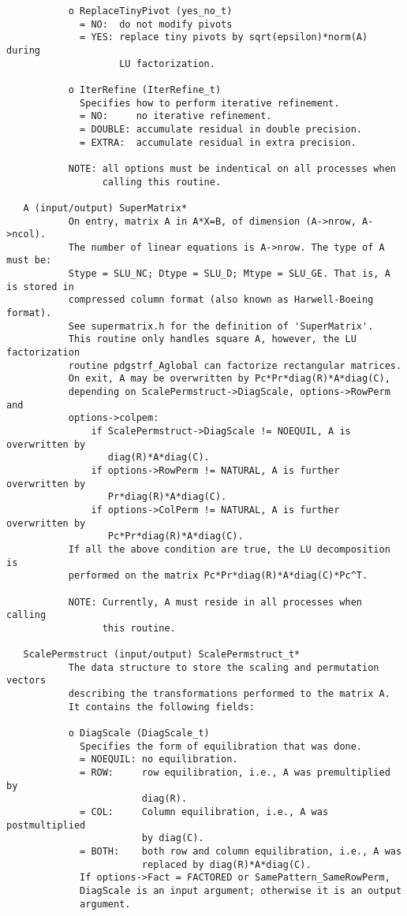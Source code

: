 \begin{verbatim}
           o ReplaceTinyPivot (yes_no_t)
             = NO:  do not modify pivots
             = YES: replace tiny pivots by sqrt(epsilon)*norm(A) during 
                    LU factorization.
  
           o IterRefine (IterRefine_t)
             Specifies how to perform iterative refinement.
             = NO:     no iterative refinement.
             = DOUBLE: accumulate residual in double precision.
             = EXTRA:  accumulate residual in extra precision.
  
           NOTE: all options must be indentical on all processes when
                 calling this routine.
  
   A (input/output) SuperMatrix*
           On entry, matrix A in A*X=B, of dimension (A->nrow, A->ncol).
           The number of linear equations is A->nrow. The type of A must be:
           Stype = SLU_NC; Dtype = SLU_D; Mtype = SLU_GE. That is, A is stored in
           compressed column format (also known as Harwell-Boeing format).
           See supermatrix.h for the definition of 'SuperMatrix'.
           This routine only handles square A, however, the LU factorization
           routine pdgstrf_Aglobal can factorize rectangular matrices.
           On exit, A may be overwritten by Pc*Pr*diag(R)*A*diag(C),
           depending on ScalePermstruct->DiagScale, options->RowPerm and
           options->colpem:
               if ScalePermstruct->DiagScale != NOEQUIL, A is overwritten by
                  diag(R)*A*diag(C).
               if options->RowPerm != NATURAL, A is further overwritten by
                  Pr*diag(R)*A*diag(C).
               if options->ColPerm != NATURAL, A is further overwritten by
                  Pc*Pr*diag(R)*A*diag(C).
           If all the above condition are true, the LU decomposition is
           performed on the matrix Pc*Pr*diag(R)*A*diag(C)*Pc^T.
  
           NOTE: Currently, A must reside in all processes when calling
                 this routine.
  
   ScalePermstruct (input/output) ScalePermstruct_t*
           The data structure to store the scaling and permutation vectors
           describing the transformations performed to the matrix A.
           It contains the following fields:
  
           o DiagScale (DiagScale_t)
             Specifies the form of equilibration that was done.
             = NOEQUIL: no equilibration.
             = ROW:     row equilibration, i.e., A was premultiplied by
                        diag(R).
             = COL:     Column equilibration, i.e., A was postmultiplied
                        by diag(C).
             = BOTH:    both row and column equilibration, i.e., A was 
                        replaced by diag(R)*A*diag(C).
             If options->Fact = FACTORED or SamePattern_SameRowPerm,
             DiagScale is an input argument; otherwise it is an output
             argument.
  

\end{verbatim}
